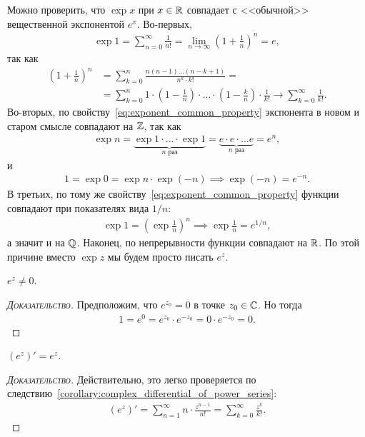 \documentclass[../complex-analysis.tex]{subfiles}
\begin{document}
Можно проверить, что $ \exp x $ при $ x \in \mathbb{R} $ совпадает с <<обычной>> вещественной экспонентой $ e^{x} $. Во-первых,
\begin{align*}
 \exp 1 = \sum_{n=0}^{\infty} \frac{1}{n!} = \lim_{n \to \infty} \left( 1 + \frac{1}{n} \right)^{n} = e,
\end{align*} так как
\begin{align*}
 \left( 1 + \frac{1}{n} \right)^{n} &= \sum_{k=0}^{n} \frac{n(n-1)\ldots(n-k+1)}{n^{k} \cdot k!} = \\
 &= \sum_{k=0}^{n} 1 \cdot \left( 1 - \frac{1}{n} \right) \cdot \ldots \cdot \left( 1 - \frac{k}{n} \right) \cdot \frac{1}{k!} \to \sum_{k=0}^{\infty}\frac{1}{k!}.
\end{align*} Во-вторых, по свойству~\eqref{eq:exponent_common_property} экспонента в новом и старом смысле совпадают на $ \mathbb{Z} $, так как
\begin{align*}
 \exp n = \underbrace{\exp 1 \cdot \ldots \cdot \exp 1}_{n \text{ раз}} = \underbrace{e \cdot e \cdot \ldots e}_{n \text{ раз}} = e^{n},
\end{align*} и
\begin{align*}
 1 = \exp 0 = \exp n \cdot \exp (-n) \implies \exp (-n) = e^{-n}.
\end{align*} В третьих, по тому же свойству~\ref{eq:exponent_common_property} функции совпадают при показателях вида $ 1 / n $:
\begin{align*}
 \exp 1 = \left( \exp \frac{1}{n} \right)^{n} \implies \exp \frac{1}{n} = e^{1 / n},
\end{align*} а значит и на $ \mathbb{Q} $. Наконец, по непрерывности функции совпадают на $ \mathbb{R} $. По этой причине вместо $ \exp z $ мы будем просто писать $ e^{z} $.

\begin{prop}
 $ e^{z} \neq 0 $.
\end{prop}
\begin{proof}[\normalfont\textsc{Доказательство}]
 Предположим, что $ e^{z_0} = 0 $ в точке $ z_0 \in \mathbb{C} $. Но тогда
 \begin{align*}
  1 = e^{0} = e^{z_0} \cdot e^{-z_0} = 0 \cdot e^{-z_0} = 0.
 \end{align*}
\end{proof}

\begin{prop}
 $ (e^{z})' = e^{z} $.
\end{prop}
\begin{proof}[\normalfont\textsc{Доказательство}]
 Действительно, это легко проверяется по следствию~\ref{corollary:complex_differential_of_power_series}:
 \begin{align*}
  (e^{z})' = \sum_{n=1}^{\infty} n \cdot \frac{z^{n-1}}{n!} = \sum_{k=0}^{\infty}\frac{z^{k}}{k!}.
 \end{align*}
\end{proof}
\end{document}
